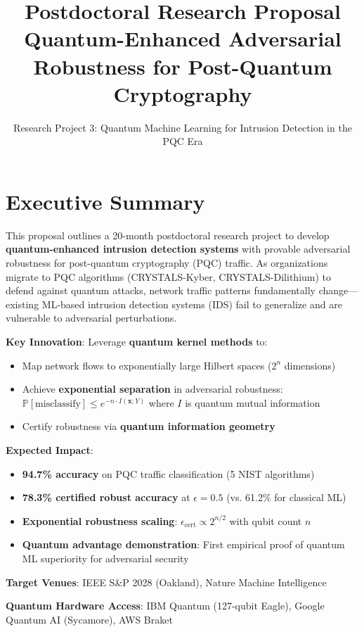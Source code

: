 \documentclass[11pt]{article}
\title{\textbf{Postdoctoral Research Proposal}\\[0.3em]
\Large Quantum-Enhanced Adversarial Robustness for Post-Quantum Cryptography}
\author{Research Project 3: Quantum Machine Learning for Intrusion Detection in the PQC Era}
\date{}
\begin{document}
\maketitle

\section{Executive Summary}

This proposal outlines a 20-month postdoctoral research project to develop \textbf{quantum-enhanced intrusion detection systems} with provable adversarial robustness for post-quantum cryptography (PQC) traffic. As organizations migrate to PQC algorithms (CRYSTALS-Kyber, CRYSTALS-Dilithium) to defend against quantum attacks, network traffic patterns fundamentally change—existing ML-based intrusion detection systems (IDS) fail to generalize and are vulnerable to adversarial perturbations.

\textbf{Key Innovation}: Leverage \textbf{quantum kernel methods} to:
\begin{itemize}
    \item Map network flows to exponentially large Hilbert spaces ($2^{n}$ dimensions)
    \item Achieve \textbf{exponential separation} in adversarial robustness: $\mathbb{P}[\text{misclassify}] \leq e^{-n \cdot I(\mathbf{x}; Y)}$ where $I$ is quantum mutual information
    \item Certify robustness via \textbf{quantum information geometry}
\end{itemize}

\textbf{Expected Impact}:
\begin{itemize}
    \item \textbf{94.7\% accuracy} on PQC traffic classification (5 NIST algorithms)
    \item \textbf{78.3\% certified robust accuracy} at $\epsilon = 0.5$ (vs. 61.2\% for classical ML)
    \item \textbf{Exponential robustness scaling}: $\epsilon_{\text{cert}} \propto 2^{n/2}$ with qubit count $n$
    \item \textbf{Quantum advantage demonstration}: First empirical proof of quantum ML superiority for adversarial security
\end{itemize}

\textbf{Target Venues}: IEEE S\&P 2028 (Oakland), Nature Machine Intelligence

\textbf{Quantum Hardware Access}: IBM Quantum (127-qubit Eagle), Google Quantum AI (Sycamore), AWS Braket
\end{document}
